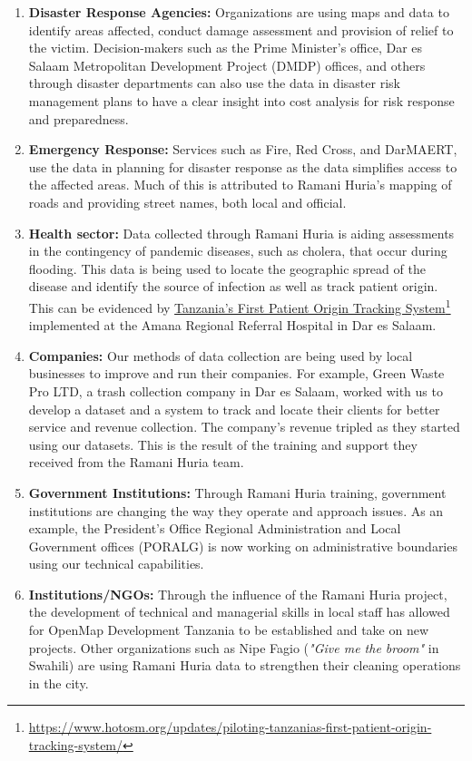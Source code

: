 \documentclass[a4paper,12pt,twoside]{article}
\begin{document}
\begin{enumerate}
\item \textbf{Disaster Response Agencies:} Organizations are using maps and data to identify areas affected, conduct damage assessment and provision of relief to the victim. Decision-makers such as the Prime Minister's office, Dar es Salaam Metropolitan Development Project (DMDP) offices, and others through disaster departments can also use the data in disaster risk management plans to have a clear insight into cost analysis for risk response and preparedness.
\item \textbf{Emergency Response:} Services such as Fire, Red Cross, and DarMAERT, use the data in planning for disaster response as the data simplifies access to the affected areas. Much of this is attributed to Ramani Huria's mapping of roads and  providing street names, both local and official.
\item \textbf{Health sector:} Data collected through Ramani Huria is aiding assessments in the contingency of pandemic diseases, such as cholera, that occur during flooding. This data is being used to locate the geographic spread of the disease and identify the source of infection as well as track patient origin. This can be evidenced by \href{https://www.hotosm.org/updates/piloting-tanzanias-first-patient-origin-tracking-system/}{Tanzania’s First Patient Origin Tracking System}\footnote{\url{https://www.hotosm.org/updates/piloting-tanzanias-first-patient-origin-tracking-system/}} implemented at the Amana Regional Referral Hospital in Dar es Salaam.
\item \textbf{Companies:} Our methods of data collection are being used by local businesses to improve and run their companies. For example, Green Waste Pro LTD, a trash collection company in Dar es Salaam, worked with us to develop a dataset and a system to track and locate their clients for better service and revenue collection. The company’s revenue tripled as they started using our datasets. This is the result of the training and support they received from the Ramani Huria team.
\item \textbf{Government Institutions:} Through Ramani Huria training, government institutions are changing the way they operate and approach issues. As an example, the President's Office Regional Administration and Local Government offices (PORALG) is now working on administrative boundaries using our technical capabilities.
\item \textbf{Institutions/NGOs:} Through the influence of the Ramani Huria project, the development of technical and managerial skills in local staff has allowed for OpenMap Development Tanzania to be established and take on new projects. Other organizations such as Nipe Fagio (\textit{"Give me the broom"} in Swahili) are using Ramani Huria data to strengthen their cleaning operations in the city.

\end{enumerate}
\end{document}
